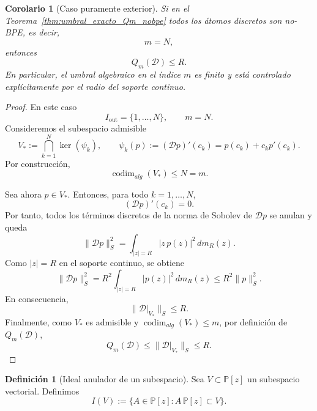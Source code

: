 \documentclass[12pt,a4paper]{article}
\newtheorem{corollary}{Corolario}
\theoremstyle{definition}
\newtheorem{definition}{Definición}
\theoremstyle{remark}
\begin{document}
\begin{corollary}[Caso puramente exterior]\label{cor:umbral_m_puramente_exterior}
	Si en el Teorema~\ref{thm:umbral_exacto_Qm_nobpe} todos los átomos discretos son no-BPE, es decir,
	\[
		m=N,
	\]
	entonces
	\[
		Q_m(\mathcal D)\le R.
	\]
	En particular, el umbral algebraico en el índice $m$ es finito y está controlado explícitamente por el radio del soporte continuo.
\end{corollary}

\begin{proof}
	En este caso
	\[
		I_{\mathrm{out}}=\{1,\dots,N\},
		\qquad
		m=N.
	\]
	Consideremos el subespacio admisible
	\[
		V_*:=\bigcap_{k=1}^N \ker(\psi_k),
		\qquad
		\psi_k(p):=(\mathcal D p)'(c_k)=p(c_k)+c_kp'(c_k).
	\]
	Por construcción,
	\[
		\operatorname{codim}_{alg}(V_*)\le N=m.
	\]

	Sea ahora $p\in V_*$. Entonces, para todo $k=1,\dots,N$,
	\[
		(\mathcal D p)'(c_k)=0.
	\]
	Por tanto, todos los términos discretos de la norma de Sobolev de $\mathcal D p$ se anulan y queda
	\[
		\|\mathcal D p\|_S^2
		=
		\int_{|z|=R} |z\,p(z)|^2\,dm_R(z).
	\]
	Como $|z|=R$ en el soporte continuo, se obtiene
	\[
		\|\mathcal D p\|_S^2
		=
		R^2\int_{|z|=R}|p(z)|^2\,dm_R(z)
		\le
		R^2\|p\|_S^2.
	\]
	En consecuencia,
	\[
		\|\mathcal D|_{V_*}\|_S\le R.
	\]
	Finalmente, como $V_*$ es admisible y $\operatorname{codim}_{alg}(V_*)\le m$, por definición de $Q_m(\mathcal D)$,
	\[
		Q_m(\mathcal D)\le \|\mathcal D|_{V_*}\|_S\le R.
	\]
\end{proof}

\begin{definition}[Ideal anulador de un subespacio]
	Sea $V\subset \mathbb P[z]$ un subespacio vectorial. Definimos
	\[
		I(V):=\{A\in \mathbb P[z]: A\,\mathbb P[z]\subset V\}.
	\]
\end{definition}
\end{document}

